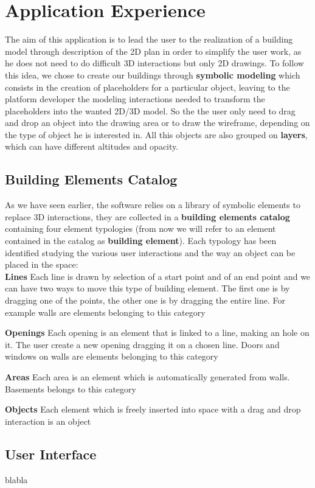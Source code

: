 \section{Application Experience}\label{sec:application}

The aim of this application is to lead the user to the realization of a building model through description of the 2D plan in order to simplify the user work, as he does not need to do difficult 3D interactions but only 2D drawings. To follow this idea, we chose to create our buildings through \textbf{symbolic modeling} which consists in the creation of placeholders for a particular object, leaving to the platform developer the modeling interactions needed to transform the placeholders into the wanted 2D/3D model. So the the user only need to drag and drop an object into the drawing area or to draw the wireframe, depending on the type of object he is interested in. All this objects are also grouped on \textbf{layers}, which can have different altitudes and opacity.

\subsection{Building Elements Catalog}\label{ssec:catalog}

As we have seen earlier, the software relies on a library of symbolic elements to replace 3D interactions, they are collected in a \textbf{building elements catalog} containing four element typologies (from now we will refer to an element contained in the catalog as \textbf{building element}). Each typology has been identified studying the various user interactions and the way an object can be placed in the space:\\

\textbf{Lines} Each line is drawn by selection of a start point and of an end point and we can have two ways to move this type of building element. The first one is by dragging one of the points, the other one is by dragging the entire line. For example walls are elements belonging to this category

\textbf{Openings} Each opening is an element that is linked to a line, making an hole on it. The user create a new opening dragging it on a chosen line. Doors and windows on walls are elements belonging to this category

\textbf{Areas} Each area is an element which is automatically generated from walls. Basements belongs to this category

\textbf{Objects} Each element which is freely inserted into space with a drag and drop interaction is an object


\subsection{User Interface}\label{ssec:ui}

blabla


